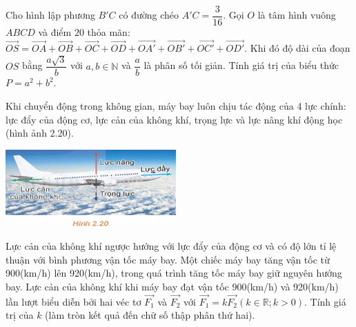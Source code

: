 \begin{ex}
	Cho hình lập phương $B'C$ có đường chéo $A'C=\dfrac{3}{16}$. Gọi $O$ là tâm hình vuông $ABCD$ và điểm $20$ thỏa mãn: $\vec{OS}=\vec{OA}+\vec{OB}+\vec{OC}+\vec{OD}+\vec{OA'}+\vec{OB'}+\vec{OC'}+\vec{OD'}$. Khi đó độ dài của đoạn $OS$ bằng $\dfrac{a\sqrt{3}}{b}$ với $a,b\in \mathbb{N}$ và $\dfrac{a}{b}$ là phân số tối giản. Tính giá trị của biểu thức $P=a^2+b^2$.
\end{ex}
\begin{ex}
	Khi chuyển động trong không gian, máy bay luôn chịu tác động của 4 lực chính: lực đẩy của động cơ, lực cản của không khí, trọng lực và lực nâng khí động học (hình ảnh 2.20).
	\begin{center}
        \includegraphics*{datak40/2D2-1/h2.20.png}
    \end{center}
	Lực cản của không khí ngược hướng với lực đẩy của động cơ và có độ lớn tỉ lệ thuận với bình phương vận tốc máy bay. Một chiếc máy bay tăng vận tốc từ 900(km/h) lên 920(km/h), trong quá trình tăng tốc máy bay giữ nguyên hướng bay. Lực cản của không khí khi máy bay đạt vận tốc 900(km/h) và 920(km/h) lần lượt biểu diễn bởi hai véc tơ $\vec{F_1}$ và $\vec{F_2}$ với $\vec{F_1}=k\vec{F_2}(k\in \mathbb{R};k>0)$. Tính giá trị của $k$ (làm tròn kết quả đến chữ số thập phân thứ hai).
\end{ex}